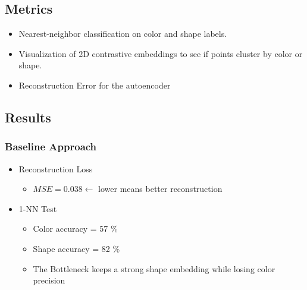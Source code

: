\documentclass{article}
\begin{document}
\subsection{Metrics}
\begin{itemize}
    \item Nearest-neighbor classification on color and shape labels.
    \item Visualization of 2D contrastive embeddings to see if points cluster by color or shape.
    \item Reconstruction Error for the autoencoder
\end{itemize}

\subsection{Results}
\subsubsection{Baseline Approach}
\begin{itemize}
    \item Reconstruction Loss
    \begin{itemize}
        \item $MSE = 0.038 \leftarrow$ lower means better reconstruction
    \end{itemize}
    \item 1-NN Test 
    \begin{itemize}
        \item Color accuracy = 57 \% 
        \item Shape accuracy = 82 \% 
        \item The Bottleneck keeps a strong shape embedding while losing color precision
    \end{itemize}
\end{itemize}
\end{document}
